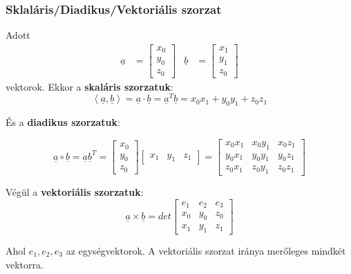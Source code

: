\documentclass{article}
\begin{document}
\subsubsection{Sklaláris/Diadikus/Vektoriális szorzat}
Adott 
\begin{align*}
    \underline{a} &= \begin{bmatrix} x_0 \\ y_0 \\ z_0 \end{bmatrix} &
    \underline{b} &= \begin{bmatrix} x_1 \\ y_1 \\ z_0 \end{bmatrix}
\end{align*}
vektorok. Ekkor a \textbf{skaláris szorzatuk}:
\begin{equation*}
    \left\langle \underline{a}, \underline{b} \right\rangle = \underline{a} \cdot \underline{b} = \underline{a}^T\underline{b} = x_0x_1 + y_0y_1 + z_0z_1
\end{equation*}

\newpage

És a \textbf{diadikus szorzatuk}:

\begin{equation*}
    \underline{a} \circ \underline{b} = \underline{a}\underline{b}^T = \begin{bmatrix} x_0 \\ y_0 \\ z_0 \end{bmatrix} \begin{bmatrix} x_1 & y_1 & z_1 \end{bmatrix} = \begin{bmatrix} x_0x_1 & x_0y_1 & x_0z_1 \\ y_0x_1 & y_0y_1 & y_0z_1 \\ z_0x_1 & z_0y_1 & z_0z_1 \end{bmatrix}
\end{equation*}

Végül a \textbf{vektoriális szorzatuk}:
\begin{equation*}
    \underline{a} \times \underline{b} = det\begin{bmatrix} e_1 & e_2 & e_3 \\ x_0 & y_0 & z_0 \\ x_1 & y_1 & z_1 \end{bmatrix}
\end{equation*}

Ahol $e_1, e_2, e_3$ az egységvektorok. A vektoriális szorzat iránya merőleges mindkét vektorra.
\end{document}
